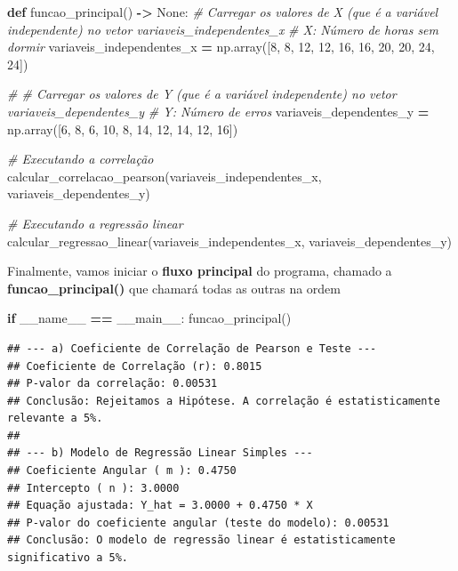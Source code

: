 \documentclass[
]{book}
\newenvironment{Shaded}{\begin{snugshade}}{\end{snugshade}}
\newcommand{\CommentTok}[1]{\textcolor[rgb]{0.56,0.35,0.01}{\textit{#1}}}
\newcommand{\ControlFlowTok}[1]{\textcolor[rgb]{0.13,0.29,0.53}{\textbf{#1}}}
\newcommand{\DecValTok}[1]{\textcolor[rgb]{0.00,0.00,0.81}{#1}}
\newcommand{\KeywordTok}[1]{\textcolor[rgb]{0.13,0.29,0.53}{\textbf{#1}}}
\newcommand{\NormalTok}[1]{#1}
\newcommand{\OperatorTok}[1]{\textcolor[rgb]{0.81,0.36,0.00}{\textbf{#1}}}
\newcommand{\StringTok}[1]{\textcolor[rgb]{0.31,0.60,0.02}{#1}}
\newcommand{\VariableTok}[1]{\textcolor[rgb]{0.00,0.00,0.00}{#1}}
\begin{document}
\begin{Shaded}
\begin{Highlighting}[]
\KeywordTok{def}\NormalTok{ funcao\_principal() }\OperatorTok{{-}\textgreater{}} \VariableTok{None}\NormalTok{:}
    \CommentTok{\# Carregar os valores de X (que é a variável independente) no vetor variaveis\_independentes\_x}
    \CommentTok{\# X: Número de horas sem dormir}
\NormalTok{    variaveis\_independentes\_x }\OperatorTok{=}\NormalTok{ np.array([}\DecValTok{8}\NormalTok{, }\DecValTok{8}\NormalTok{, }\DecValTok{12}\NormalTok{, }\DecValTok{12}\NormalTok{, }\DecValTok{16}\NormalTok{, }\DecValTok{16}\NormalTok{, }\DecValTok{20}\NormalTok{, }\DecValTok{20}\NormalTok{, }\DecValTok{24}\NormalTok{, }\DecValTok{24}\NormalTok{])}

    \CommentTok{\# \# Carregar os valores de Y (que é a variável independente) no vetor variaveis\_dependentes\_y}
    \CommentTok{\# Y: Número de erros}
\NormalTok{    variaveis\_dependentes\_y }\OperatorTok{=}\NormalTok{ np.array([}\DecValTok{6}\NormalTok{, }\DecValTok{8}\NormalTok{, }\DecValTok{6}\NormalTok{, }\DecValTok{10}\NormalTok{, }\DecValTok{8}\NormalTok{, }\DecValTok{14}\NormalTok{, }\DecValTok{12}\NormalTok{, }\DecValTok{14}\NormalTok{, }\DecValTok{12}\NormalTok{, }\DecValTok{16}\NormalTok{])}

    \CommentTok{\# Executando a correlação}
\NormalTok{    calcular\_correlacao\_pearson(variaveis\_independentes\_x, variaveis\_dependentes\_y)}

    \CommentTok{\# Executando a regressão linear}
\NormalTok{    calcular\_regressao\_linear(variaveis\_independentes\_x, variaveis\_dependentes\_y)}
\end{Highlighting}
\end{Shaded}

Finalmente, vamos iniciar o \textbf{fluxo principal} do programa, chamado a
\textbf{funcao\_principal()} que chamará todas as outras na ordem

\begin{Shaded}
\begin{Highlighting}[]
\ControlFlowTok{if} \VariableTok{\_\_name\_\_} \OperatorTok{==} \StringTok{\textquotesingle{}\_\_main\_\_\textquotesingle{}}\NormalTok{:}
\NormalTok{    funcao\_principal()}
\end{Highlighting}
\end{Shaded}

\begin{verbatim}
## --- a) Coeficiente de Correlação de Pearson e Teste ---
## Coeficiente de Correlação (r): 0.8015
## P-valor da correlação: 0.00531
## Conclusão: Rejeitamos a Hipótese. A correlação é estatisticamente relevante a 5%.
## 
## --- b) Modelo de Regressão Linear Simples ---
## Coeficiente Angular ( m ): 0.4750
## Intercepto ( n ): 3.0000
## Equação ajustada: Y_hat = 3.0000 + 0.4750 * X
## P-valor do coeficiente angular (teste do modelo): 0.00531
## Conclusão: O modelo de regressão linear é estatisticamente significativo a 5%.
\end{verbatim}
\end{document}
